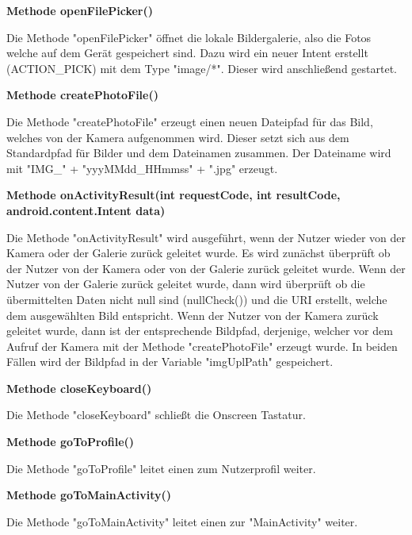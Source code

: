 \documentclass{scrartcl}
\begin{document}
\noindent\textbf{Methode openFilePicker()} 

\noindent Die Methode "openFilePicker" öffnet die lokale Bildergalerie, also die Fotos welche auf dem Gerät gespeichert sind. Dazu wird ein neuer Intent erstellt (ACTION\_PICK) mit dem Type "image/*". Dieser wird anschließend gestartet. \newline

\noindent\textbf{Methode createPhotoFile()} 

\noindent Die Methode "createPhotoFile" erzeugt einen neuen Dateipfad für das Bild, welches von der Kamera aufgenommen wird. Dieser setzt sich aus dem Standardpfad für Bilder und dem Dateinamen zusammen. Der Dateiname wird mit "IMG\_" + "yyyMMdd\_HHmmss" + ".jpg" erzeugt. \newline

\noindent\textbf{Methode onActivityResult(int requestCode, int resultCode, \newline android.content.Intent data)} 

\noindent Die Methode "onActivityResult" wird ausgeführt, wenn der Nutzer wieder von der Kamera oder der Galerie zurück geleitet wurde. Es wird zunächst überprüft ob der Nutzer von der Kamera oder von der Galerie zurück geleitet wurde. Wenn der Nutzer von der Galerie zurück geleitet wurde, dann wird überprüft ob die übermittelten Daten nicht null sind (nullCheck()) und die URI erstellt, welche dem ausgewählten Bild entspricht. Wenn der Nutzer von der Kamera zurück geleitet wurde, dann ist der entsprechende Bildpfad, derjenige, welcher vor dem Aufruf der Kamera mit der Methode "createPhotoFile" erzeugt wurde. In beiden Fällen wird der Bildpfad in der Variable "imgUplPath" gespeichert. \newline

\noindent\textbf{Methode closeKeyboard()} 

\noindent Die Methode "closeKeyboard" schließt die Onscreen Tastatur. \newline 

\noindent\textbf{Methode goToProfile()} 

\noindent Die Methode "goToProfile" leitet einen zum Nutzerprofil weiter. \newline

\noindent\textbf{Methode goToMainActivity()} 

\noindent Die Methode "goToMainActivity" leitet einen zur "MainActivity" weiter. \newline

\newpage
\end{document}
